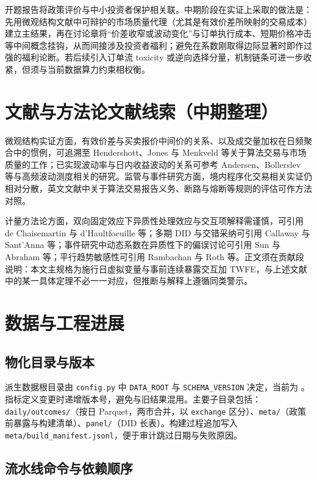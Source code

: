 \documentclass[UTF8, a4paper, 12pt]{ctexart}
\newcommand{\id}[1]{{\footnotesize\nolinkurl{#1}}}
\begin{document}
开题报告将政策评价与中小投资者保护相关联。中期阶段在实证上采取的做法是：先用微观结构文献中可辩护的市场质量代理（尤其是有效价差所映射的交易成本）建立主结果，再在讨论章将“价差收窄或波动变化”与订单执行成本、短期价格冲击等中间概念挂钩，从而间接涉及投资者福利；避免在系数刚取得边际显著时即作过强的福利论断。若后续引入订单流 toxicity 或逆向选择分量，机制链条可进一步收紧，但须与当前数据算力约束相权衡。

\section{文献与方法论文献线索（中期整理）}

微观结构实证方面，有效价差与买卖报价中间价的关系、以及成交量加权在日频聚合中的惯例，可追溯至 Hendershott、Jones 与 Menkveld 等关于算法交易与市场质量的工作；已实现波动率与日内收益波动的关系可参考 Andersen、Bollerslev 等与高频波动测度相关的研究。监管与事件研究方面，境内程序化交易相关实证仍相对分散，英文文献中关于算法交易报告义务、断路与熔断等规则的评估可作方法对照。

计量方法论方面，双向固定效应下异质性处理效应与交互项解释需谨慎，可引用 de Chaisemartin 与 d'Haultfoeuille 等；多期 DID 与交错采纳可引用 Callaway 与 Sant'Anna 等；事件研究中动态系数在异质性下的偏误讨论可引用 Sun 与 Abraham 等；平行趋势敏感性可引用 Rambachan 与 Roth 等。正文须在贡献段说明：本文主规格为施行日虚拟变量与事前连续暴露交互加 TWFE，与上述文献中的某一具体定理不必一一对应，但推断与解释上遵循同类警示。

\section{数据与工程进展}

\subsection{物化目录与版本}

派生数据根目录由 \id{config.py} 中 \id{DATA_ROOT} 与 \id{SCHEMA_VERSION} 决定，当前为 。指标定义变更时递增版本号，避免与旧结果混用。主要子目录包括：\id{daily/outcomes/}（按日 Parquet，两市合并，以 \id{exchange} 区分）、\id{meta/}（政策前暴露与构建清单）、\id{panel/}（DID 长表）。构建过程追加写入 \id{meta/build_manifest.jsonl}，便于审计跳过日期与失败原因。

\subsection{流水线命令与依赖顺序}
\end{document}
